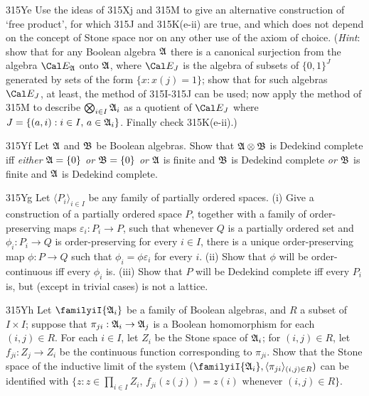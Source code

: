 {\spheader 315Ye Use the ideas of 315Xj and 315M to give an
alternative construction of `free product', for which 315J and
315K(e-ii) are true, and
which does not depend on the concept of Stone space nor on any other use
of the axiom of choice.   ({\it Hint\/}:  show that for any Boolean
algebra $\frak A$ there is a canonical surjection from the algebra
$\Cal E_{\frak A}$ onto $\frak A$, where $\Cal E_J$ is the algebra of
subsets of $\{0,1\}^J$ generated by sets of the form $\{x:x(j)=1\}$;
show that for such algebras $\Cal E_J$, at least, the method of
315I-315J can be used;  now apply the method of 315M to describe
$\bigotimes_{i\in I}\frak A_i$ as a quotient of $\Cal E_J$ where
$J=\{(a,i):i\in I,\,a\in\frak A_i\}$.   Finally check 315K(e-ii).)

\spheader 315Yf Let $\frak A$ and $\frak B$ be
Boolean algebras.   Show that $\frak A\otimes\frak B$ is Dedekind
complete iff {\it either} $\frak A=\{0\}$ {\it or} $\frak B=\{0\}$ {\it
or} $\frak A$ is finite and $\frak B$ is Dedekind complete {\it or}
$\frak B$ is finite and $\frak A$ is Dedekind complete.

\spheader 315Yg Let $\langle P_i\rangle_{i\in I}$ be any family
of partially ordered spaces.   (i) Give a construction of a partially
ordered space $P$, together with a family of order-preserving maps
$\varepsilon_i:P_i\to P$, such that whenever $Q$ is a partially ordered
set and $\phi_i:P_i\to Q$ is order-preserving for every $i\in I$, there
is a unique order-preserving map $\phi:P\to Q$ such that
$\phi_i=\phi\varepsilon_i$ for every $i$.  (ii) Show that $\phi$ will be
order-continuous iff every $\phi_i$ is.   (iii) Show that $P$ will be
Dedekind complete iff every $P_i$ is, but (except in trivial cases) is
not a lattice.

\spheader 315Yh Let $\familyiI{\frak A_i}$
be a family of Boolean algebras, and $R$ a subset of $I\times I$;  suppose
that $\pi_{ji}:\frak A_i\to\frak A_j$ is a Boolean homomorphism for each
$(i,j)\in R$.   For each $i\in I$, let
$Z_i$ be the Stone space of $\frak A_i$;  for $(i,j)\in R$, let
$f_{ji}:Z_j\to Z_i$ be the continuous function corresponding to $\pi_{ji}$.
Show that the Stone space of the inductive limit of the system
$(\familyiI{\frak A_i},\langle\pi_{ji}\rangle_{(i,j)\in R})$ can be
identified with
$\{z:z\in\prod_{i\in I}Z_i$, $f_{ji}(z(j))=z(i)$ whenever $(i,j)\in R\}$.
}%

